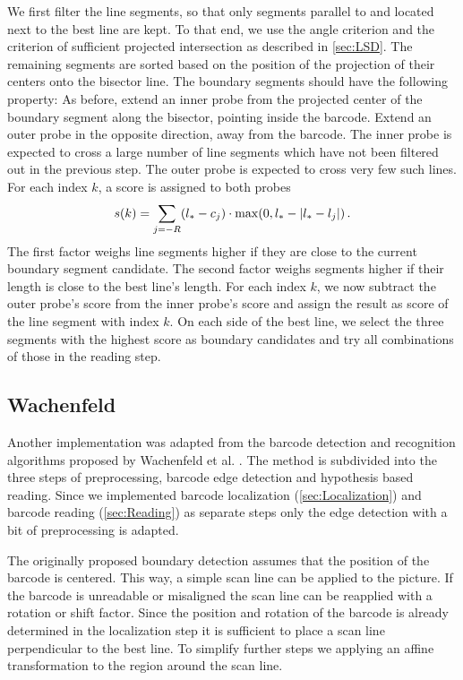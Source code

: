 We first filter the line segments, so that only segments parallel to and located
next to the best
line are kept. To that end, we use the angle criterion and the criterion of sufficient
projected intersection as described in \cref{sec:LSD}. The remaining segments
are sorted based on the position of the projection of their centers onto the
bisector line. The boundary segments should have the following property: As before,
extend an inner probe from the projected center of the boundary segment along the bisector, pointing inside the
barcode. Extend an outer probe in the opposite direction, away from the barcode.
The inner probe is expected to cross a large number of line segments which have not been
filtered out in the previous step. The outer probe is expected to cross very few
such lines.
For each index $k$, a score is assigned to both probes
\begin{equation*}
 s(k)=\sum_{j=-R}(l_*-c_j)\cdot \max(0, l_*-\lvert l_*-l_j\rvert)\,.
\end{equation*}
The first factor weighs line segments higher if they are close to the
current boundary segment candidate. The second factor weighs segments higher if
their length is close to the best line's length.
For each index $k$, we now subtract the outer probe's score from the inner
probe's score and assign the result as score of the line segment with index $k$.
On each side of the best line, we select the three segments with the highest
score as boundary candidates and try all combinations of those in the reading step.

\subsection[Wachenfeld]{Wachenfeld}
Another implementation was adapted from the barcode detection and recognition algorithms proposed by Wachenfeld et al. \cite{wachenfeld2008robust}. The method is subdivided into the three steps of preprocessing, barcode edge detection and hypothesis based reading. Since we implemented barcode localization (\cref{sec:Localization}) and barcode reading (\cref{sec:Reading}) as separate steps only the edge detection with a bit of preprocessing is adapted.

The originally proposed boundary detection assumes that the position of the barcode is centered. This way, a simple scan line can be applied to the picture. If the barcode is unreadable or misaligned the scan line can be reapplied with a rotation or shift factor. Since the position and rotation of the barcode is already determined in the localization step it is sufficient to place a scan line perpendicular to the best line. To simplify further steps we applying an affine transformation to the region around the scan line.

